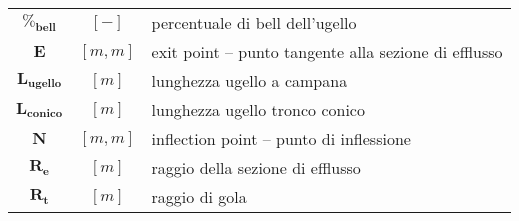 \begin{multicols}{2}
{\begin{xltabular}{\linewidth}{cc>{\raggedright\arraybackslash}X}
        $\bm{\%_{bell} }$ & $[-]$ & percentuale di bell dell’ugello \\
		$\bm{E}$ & $[m, m]$ & exit point – punto tangente alla sezione di efflusso  \\
		$\bm{L_{ugello}}$ & $[m]$ & lunghezza ugello a campana \\
	    $\bm{L_{conico}}$ & $[m]$ & lunghezza ugello tronco conico \\
		$\bm{N}$ & $[m, m]$ & inflection point – punto di inflessione \\
		$\bm{R_e}$ & $[m]$ & raggio della sezione di efflusso \\
        $\bm{R_t}$ & $[m]$ & raggio di gola
	\end{xltabular}
	\unskip
	\unpenalty
	\unpenalty}
	\unvbox\ltmcbox

	\columnbreak


\end{multicols}
